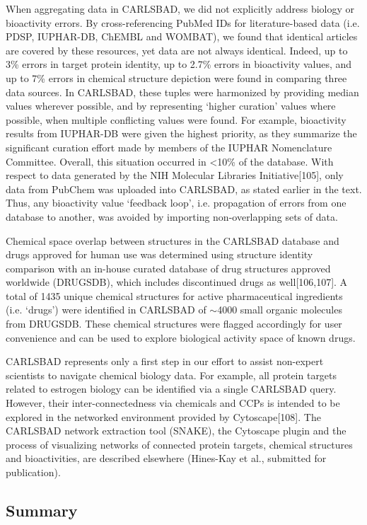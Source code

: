 When aggregating data in CARLSBAD, we did not explicitly address biology or bioactivity errors. By cross-referencing PubMed IDs for literature-based data (i.e. PDSP, IUPHAR-DB, ChEMBL and WOMBAT), we found that identical articles are covered by these resources, yet data are not always identical. Indeed, up to 3\% errors in target protein identity, up to 2.7\% errors in bioactivity values, and up to 7\% errors in chemical structure depiction were found in comparing three data sources. In CARLSBAD, these tuples were harmonized by providing median values wherever possible, and by representing ‘higher curation’ values where possible, when multiple conflicting values were found. For example, bioactivity results from IUPHAR-DB were given the highest priority, as they summarize the significant curation effort made by members of the IUPHAR Nomenclature Committee. Overall, this situation occurred in <10\% of the database. With respect to data generated by the NIH Molecular Libraries Initiative[105], only data from PubChem was uploaded into CARLSBAD, as stated earlier in the text. Thus, any bioactivity value ‘feedback loop’, i.e. propagation of errors from one database to another, was avoided by importing non-overlapping sets of data.

Chemical space overlap between structures in the CARLSBAD database and drugs approved for human use was determined using structure identity comparison with an in-house curated database of drug structures approved worldwide (DRUGSDB), which includes discontinued drugs as well[106,107]. A total of 1435 unique chemical structures for active pharmaceutical ingredients (i.e. ‘drugs’) were identified in CARLSBAD of $\sim$4000 small organic molecules from DRUGSDB. These chemical structures were flagged accordingly for user convenience and can be used to explore biological activity space of known drugs.

CARLSBAD represents only a first step in our effort to assist non-expert scientists to navigate chemical biology data. For example, all protein targets related to estrogen biology can be identified via a single CARLSBAD query. However, their inter-connectedness via chemicals and CCPs is intended to be explored in the networked environment provided by Cytoscape[108]. The CARLSBAD network extraction tool (SNAKE), the Cytoscape plugin and the process of visualizing networks of connected protein targets, chemical structures and bioactivities, are described elsewhere (Hines-Kay et al., submitted for publication).

\subsection{Summary}


